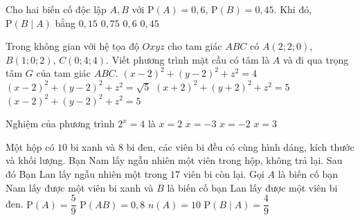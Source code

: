 \begin{ex}%
	Cho hai biến cố độc lập $A,B$ với $\mathrm{P}(A)=0{,}6$, $\mathrm{P}(B)=0{,}45$. Khi đó, $\mathrm{P}(B\mid A)$ bằng
	\choice
	{$0{,}15$}
	{$0{,}75$}
	{$0{,}6$}
	{\True $0{,}45$}
\end{ex}

\begin{ex}%
	Trong không gian với hệ tọa độ $Oxyz$ cho tam giác $ABC$ có $A(2;2;0)$, $B(1;0;2)$, $C(0;4;4)$. Viết phương trình mặt cầu có tâm là $A$ và đi qua trọng tâm $G$ của tam giác $ABC$.
	\choice
	{$(x-2)^2+(y-2)^2+z^2=4$}
	{$(x-2)^2+(y-2)^2+z^2=\sqrt{5}$}
	{$(x+2)^2+(y+2)^2+z^2=5$}
	{\True $(x-2)^2+(y-2)^2+z^2=5$}
\end{ex}

\begin{ex}%
	Nghiệm của phương trình $2^x=4$ là
	\choice
	{\True $x=2$}
	{$x=-3$}
	{$x=-2$}
	{$x=3$}
\end{ex}

\cauds
\begin{ex}%
	Một hộp có $10$ bi xanh và $8$ bi đen, các viên bi đều có cùng hình dáng, kích thước và khối lượng. Bạn Nam lấy ngẫu nhiên một viên trong hộp, không trả lại. Sau đó Bạn Lan lấy ngẫu nhiên một trong $17$ viên bi còn lại. Gọi $A$ là biến cố bạn Nam lấy được một viên bi xanh và $B$ là biến cố bạn Lan lấy được một viên bi đen.
	\choiceTF
	{\True $\mathrm{P}\left(A\right)=\dfrac{5}{9}$}
	{$\mathrm{P}\left(AB\right)=0{,}8$}
	{\True $n(A)=10$}
	{$\mathrm{P}\left(B\mid A\right)=\dfrac{4}{9}$}
\end{ex}

